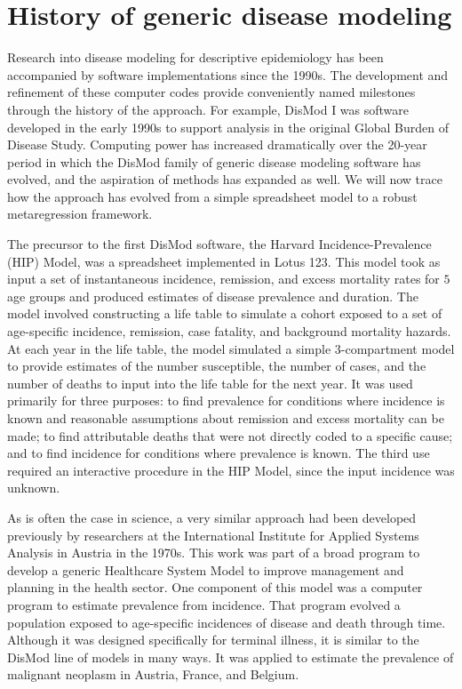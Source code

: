 \section{History of generic disease modeling}

Research into disease modeling for descriptive
epidemiology has been accompanied by software implementations since
the 1990s.  The development and refinement of these computer codes
provide conveniently named milestones through the history of the
approach.  For example, DisMod I was software developed in the early
1990s to support analysis in the original Global Burden of Disease
Study.  Computing power has increased dramatically over the 20-year
period in which the DisMod family of generic disease modeling software
has evolved, and the aspiration of methods has expanded as well. We will
now trace how the approach has evolved from a simple spreadsheet model
to a robust metaregression framework.

The precursor to the first DisMod software, the Harvard Incidence-Prevalence
(HIP) Model, was a spreadsheet implemented in Lotus 123.
\cite{Murray_Quantifying_1994} This model took as input a set of
instantaneous incidence, remission, and excess mortality rates for $5$
age groups and produced estimates of disease prevalence and duration.
The model involved constructing a life table to simulate a cohort
exposed to a set of age-specific incidence, remission, case fatality,
and background mortality hazards. At each year in the life table, the
model simulated a simple $3$-compartment model to provide estimates of
the number susceptible, the number of cases, and the number of deaths
to input into the life table for the next year.  It was used primarily
for three purposes: to find prevalence for conditions where incidence
is known and reasonable assumptions about remission and excess
mortality can be made; to find attributable deaths that were not
directly coded to a specific cause; and to find incidence for
conditions where prevalence is known.  The third use required an
interactive procedure in the HIP Model, since the input incidence was
unknown.

As is often the case in science, a very similar approach had been
developed previously by researchers at the International Institute
for Applied Systems Analysis in Austria in the 1970s.\cite{international_institute_for_applied_systems_analysis._estimation_1977} This work was
part of a broad program to develop a generic Healthcare System Model
to improve management and planning in the health sector. One component
of this model was a computer program to estimate prevalence from
incidence. That program evolved a population
exposed to age-specific incidences of disease and death through time.
Although it was designed specifically for terminal illness, it is
similar to the DisMod line of models in many ways. It was applied to
estimate the prevalence of malignant neoplasm in Austria, France, and
Belgium.


